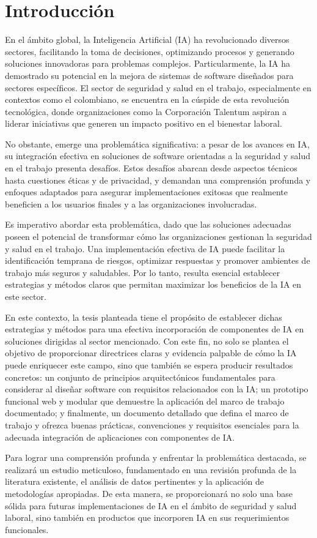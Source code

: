 \section{Introducción}

En el ámbito global, la Inteligencia Artificial (IA) ha revolucionado diversos sectores, facilitando la toma de decisiones, optimizando procesos y generando soluciones innovadoras para problemas complejos. Particularmente, la IA ha demostrado su potencial en la mejora de sistemas de software diseñados para sectores específicos. El sector de seguridad y salud en el trabajo, especialmente en contextos como el colombiano, se encuentra en la cúspide de esta revolución tecnológica, donde organizaciones como la Corporación Talentum aspiran a liderar iniciativas que generen un impacto positivo en el bienestar laboral.

No obstante, emerge una problemática significativa: a pesar de los avances en IA, su integración efectiva en soluciones de software orientadas a la seguridad y salud en el trabajo presenta desafíos. Estos desafíos abarcan desde aspectos técnicos hasta cuestiones éticas y de privacidad, y demandan una comprensión profunda y enfoques adaptados para asegurar implementaciones exitosas que realmente beneficien a los usuarios finales y a las organizaciones involucradas.

Es imperativo abordar esta problemática, dado que las soluciones adecuadas poseen el potencial de transformar cómo las organizaciones gestionan la seguridad y salud en el trabajo. Una implementación efectiva de IA puede facilitar la identificación temprana de riesgos, optimizar respuestas y promover ambientes de trabajo más seguros y saludables. Por lo tanto, resulta esencial establecer estrategias y métodos claros que permitan maximizar los beneficios de la IA en este sector.

En este contexto, la tesis planteada tiene el propósito de establecer dichas estrategias y métodos para una efectiva incorporación de componentes de IA en soluciones dirigidas al sector mencionado. Con este fin, no solo se plantea el objetivo de proporcionar directrices claras y evidencia palpable de cómo la IA puede enriquecer este campo, sino que también se espera producir resultados concretos: un conjunto de principios arquitectónicos fundamentales para considerar al diseñar software con requisitos relacionados con la IA; un prototipo funcional web y modular que demuestre la aplicación del marco de trabajo documentado; y finalmente, un documento detallado que defina el marco de trabajo y ofrezca buenas prácticas, convenciones y requisitos esenciales para la adecuada integración de aplicaciones con componentes de IA.

Para lograr una comprensión profunda y enfrentar la problemática destacada, se realizará un estudio meticuloso, fundamentado en una revisión profunda de la literatura existente, el análisis de datos pertinentes y la aplicación de metodologías apropiadas. De esta manera, se proporcionará no solo una base sólida para futuras implementaciones de IA en el ámbito de seguridad y salud laboral, sino también en productos que incorporen IA en sus requerimientos funcionales.
